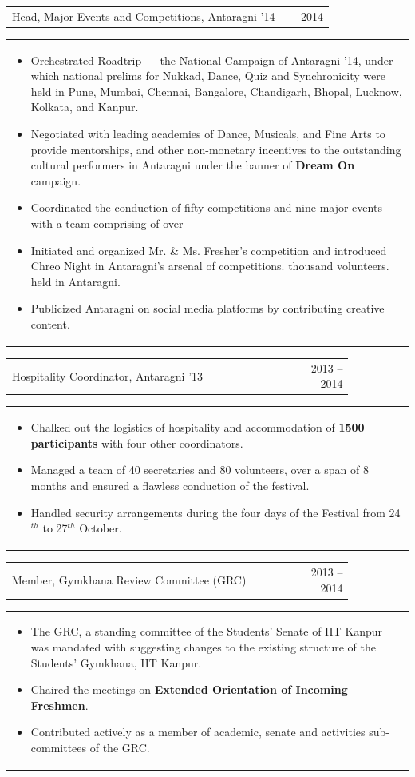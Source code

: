 \documentclass[a4paper,10pt]{article} %
\newcommand{\iproject}[3]{
    \begin{tabular}{p{0.85\linewidth}r}
        \textcolor{NavyBlue}{#2} & \multicolumn{1}{m{3cm}}{\raggedleft \textsc{#1}}\\
    \end{tabular}
    \begin{tabular}{p{\linewidth}}
    \vspace{-0.3cm}
        \footnotesize{#3}
    \end{tabular}
    \vspace{-0.5cm}
}
\begin{document}
\iproject {2014}
          {Head, Major Events and Competitions, Antaragni '14}
          {
               \begin{itemize}[leftmargin=0.5cm]
                    \item Orchestrated Roadtrip --- the National Campaign of Antaragni '14, under which national prelims for Nukkad,
                        Dance, Quiz and Synchronicity were held in Pune, Mumbai, Chennai, Bangalore, Chandigarh, Bhopal, Lucknow,
                        Kolkata, and Kanpur.
                    \item Negotiated with leading academies of Dance, Musicals, and Fine Arts to provide mentorships, and other
                        non-monetary incentives to the outstanding cultural performers in Antaragni under the banner
                        of \textbf{Dream On} campaign.
                    \item Coordinated the conduction of fifty competitions and nine major events with a team comprising of over
                    \item Initiated and organized Mr. \& Ms. Fresher's competition and introduced Chreo Night in Antaragni's arsenal of competitions.
                        thousand volunteers.
                        held in Antaragni.
                    \item Publicized Antaragni on social media platforms by contributing creative content.
               \end{itemize}
          }

\iproject {2013 -- 2014}
          {Hospitality Coordinator, Antaragni '13}
          {
               \begin{itemize}[leftmargin=0.5cm]
                   \item Chalked out the logistics of hospitality and accommodation of \textbf{1500 participants} with four other coordinators.
                   \item Managed a team of 40 secretaries and 80 volunteers, over a span of 8 months and ensured a flawless conduction of the festival.
                   \item Handled security arrangements during the four days of the Festival from 24$^{th}$ to 27$^{th}$ October.
               \end{itemize}
          }

\iproject {2013 -- 2014}
          {Member, Gymkhana Review Committee (GRC)}
          {
               \begin{itemize}[leftmargin=0.5cm]
                   \item The GRC, a standing committee of the Students' Senate of IIT Kanpur was mandated with
                       suggesting changes to the existing structure of the Students' Gymkhana, IIT Kanpur.
                   \item Chaired the meetings on \textbf{Extended Orientation of Incoming Freshmen}.
                   \item Contributed actively as a member of academic, senate and activities sub-committees of the GRC.
               \end{itemize}
          }
\end{document}
